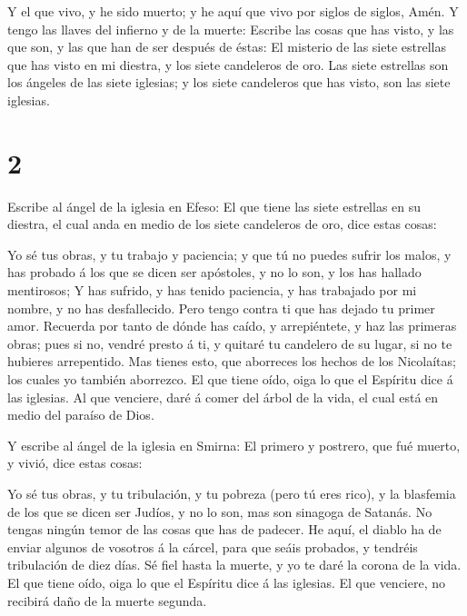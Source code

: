  Y el que vivo, y he sido muerto; y he aquí que vivo por
siglos de siglos, Amén. Y tengo las llaves del infierno y de la muerte:
 Escribe las cosas que has visto, y las que son, y las que
han de ser después de éstas:  El misterio de las siete
estrellas que has visto en mi diestra, y los siete candeleros de oro.
Las siete estrellas son los ángeles de las siete iglesias; y los siete
candeleros que has visto, son las siete iglesias.

\hypertarget{section-1}{%
\section{2}\label{section-1}}

 Escribe al ángel de la iglesia en Efeso: El que tiene las
siete estrellas en su diestra, el cual anda en medio de los siete
candeleros de oro, dice estas cosas:

 Yo sé tus obras, y tu trabajo y paciencia; y que tú no
puedes sufrir los malos, y has probado á los que se dicen ser apóstoles,
y no lo son, y los has hallado mentirosos;  Y has sufrido, y
has tenido paciencia, y has trabajado por mi nombre, y no has
desfallecido.  Pero tengo contra ti que has dejado tu primer
amor.  Recuerda por tanto de dónde has caído, y
arrepiéntete, y haz las primeras obras; pues si no, vendré presto á ti,
y quitaré tu candelero de su lugar, si no te hubieres arrepentido.
 Mas tienes esto, que aborreces los hechos de los
Nicolaítas; los cuales yo también aborrezco.  El que tiene
oído, oiga lo que el Espíritu dice á las iglesias. Al que venciere, daré
á comer del árbol de la vida, el cual está en medio del paraíso de Dios.

 Y escribe al ángel de la iglesia en Smirna: El primero y
postrero, que fué muerto, y vivió, dice estas cosas:

 Yo sé tus obras, y tu tribulación, y tu pobreza (pero tú
eres rico), y la blasfemia de los que se dicen ser Judíos, y no lo son,
mas son sinagoga de Satanás.  No tengas ningún temor de las
cosas que has de padecer. He aquí, el diablo ha de enviar algunos de
vosotros á la cárcel, para que seáis probados, y tendréis tribulación de
diez días. Sé fiel hasta la muerte, y yo te daré la corona de la vida.
 El que tiene oído, oiga lo que el Espíritu dice á las
iglesias. El que venciere, no recibirá daño de la muerte segunda.

